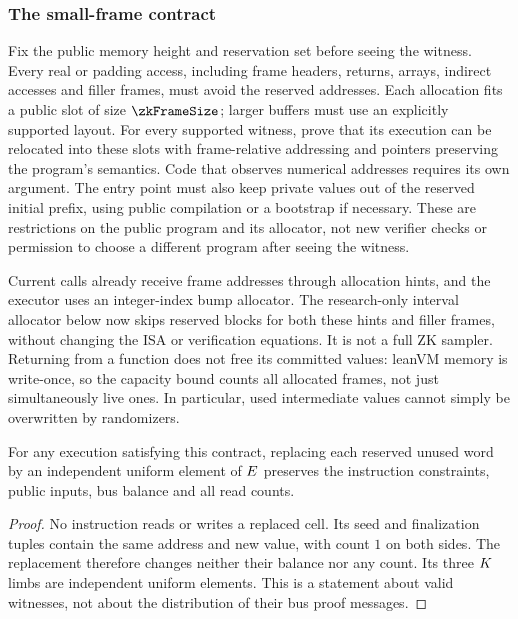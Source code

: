 \subsubsection{The small-frame contract}

Fix the public memory height and reservation set before seeing the witness. Every real or padding access, including frame headers, returns, arrays, indirect accesses and filler frames, must avoid the reserved addresses. Each allocation fits a public slot of size $\zkFrameSize$; larger buffers must use an explicitly supported layout. For every supported witness, prove that its execution can be relocated into these slots with frame-relative addressing and pointers preserving the program's semantics. Code that observes numerical addresses requires its own argument. The entry point must also keep private values out of the reserved initial prefix, using public compilation or a bootstrap if necessary. These are restrictions on the public program and its allocator, not new verifier checks or permission to choose a different program after seeing the witness.

Current calls already receive frame addresses through allocation hints, and the executor uses an integer-index bump allocator. The research-only interval allocator below now skips reserved blocks for both these hints and filler frames, without changing the ISA or verification equations. It is not a full ZK sampler. Returning from a function does not free its committed values: leanVM memory is write-once, so the capacity bound counts all allocated frames, not just simultaneously live ones. In particular, used intermediate values cannot simply be overwritten by randomizers.

\begin{lemma}\label{lem:zk-unused-frame-words}
For any execution satisfying this contract, replacing each reserved unused word by an independent uniform element of $E$ preserves the instruction constraints, public inputs, bus balance and all read counts.
\end{lemma}
\begin{proof}
No instruction reads or writes a replaced cell. Its seed and finalization tuples contain the same address and new value, with count $1$ on both sides. The replacement therefore changes neither their balance nor any count. Its three $K$ limbs are independent uniform elements. This is a statement about valid witnesses, not about the distribution of their bus proof messages.
\end{proof}

